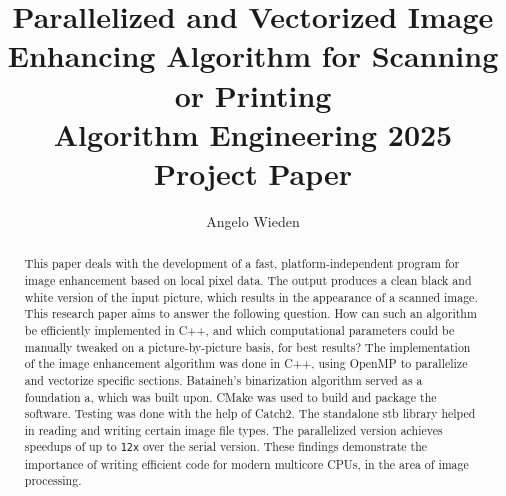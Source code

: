 \documentclass[sigconf]{acmart}
\begin{document}
\title[Parallelized and Vectorized Image Enhancing Algorithm for Scanning or Printing]{Parallelized and Vectorized Image Enhancing Algorithm for Scanning or Printing \\\large Algorithm Engineering 2025 Project Paper}


\author{Angelo Wieden}


\begin{abstract}


This paper deals with the development of a fast, platform-independent program for image enhancement based on local pixel data. The output produces a clean black and white version of the input picture, which results in the appearance of a scanned image. This research paper aims to answer the following question. How can such an algorithm be efficiently implemented in C++, and which computational parameters could be manually tweaked on a picture-by-picture basis, for best results? The implementation of the image enhancement algorithm was done in C++, using OpenMP to parallelize and vectorize specific sections. Bataineh's binarization algorithm served as a foundation a, which was built upon. CMake was used to build and package the software. Testing was done with the help of Catch2. The standalone stb library helped in reading and writing certain image file types. The parallelized version achieves speedups of up to \texttt{12x} over the serial version. These findings demonstrate the importance of writing efficient code for modern multicore CPUs, in the area of image processing.



\end{abstract}



\maketitle
\end{document}
